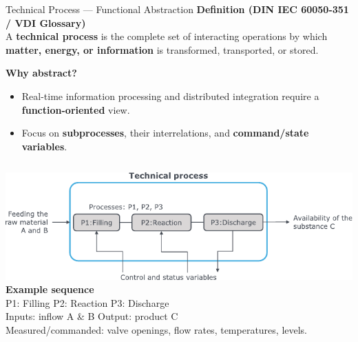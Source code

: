\begin{frame}{Technical Process — Functional Abstraction}
\textbf{Definition (DIN IEC 60050-351 / VDI Glossary)}\\
A \textbf{technical process} is the complete set of interacting operations by which \textbf{matter, energy, or information} is transformed, transported, or stored.

\vspace{1.5mm}
\textbf{Why abstract?}
\begin{itemize}
  \item Real-time information processing and distributed integration require a \textbf{function-oriented} view.
  \item Focus on \textbf{subprocesses}, their interrelations, and \textbf{command/state variables}.
\end{itemize}

\begin{columns}[T,onlytextwidth]
\includegraphics[width=\linewidth]{fig/lec01/example_tech_process.pdf}
\footnotesize
\textbf{Example sequence}\\
P1: Filling \quad P2: Reaction \quad P3: Discharge\\[1mm]
Inputs: inflow A \& B \quad Output: product C\\
Measured/commanded: valve openings, flow rates, temperatures, levels.
\end{columns}
\end{frame}

